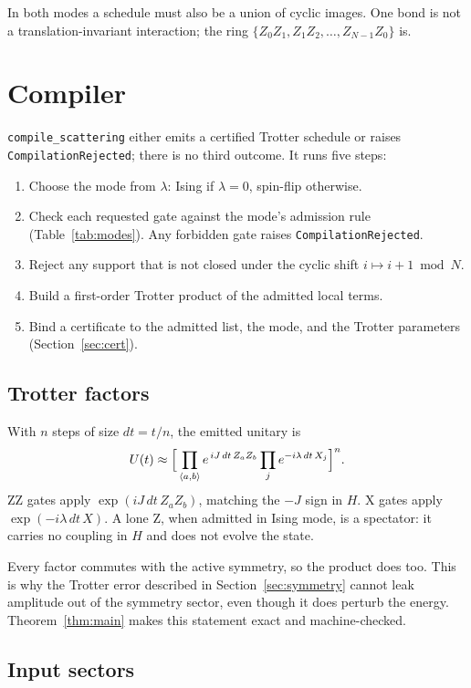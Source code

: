 \documentclass[11pt]{article}
\theoremstyle{definition}
\newcommand{\lean}[1]{\texttt{#1}}
\begin{document}
In both modes a schedule must also be a union of cyclic images. One bond is not a translation-invariant interaction; the ring $\{Z_0Z_1, Z_1Z_2, \dots, Z_{N-1}Z_0\}$ is.

\section{Compiler}

\lean{compile\_scattering} either emits a certified Trotter schedule or raises \lean{CompilationRejected}; there is no third outcome. It runs five steps:
\begin{enumerate}[nosep]
  \item Choose the mode from $\lambda$: Ising if $\lambda = 0$, spin-flip otherwise.
  \item Check each requested gate against the mode's admission rule (Table~\ref{tab:modes}). Any forbidden gate raises \lean{CompilationRejected}.
  \item Reject any support that is not closed under the cyclic shift $i \mapsto i + 1 \bmod N$.
  \item Build a first-order Trotter product of the admitted local terms.
  \item Bind a certificate to the admitted list, the mode, and the Trotter parameters (Section~\ref{sec:cert}).
\end{enumerate}

\subsection{Trotter factors}

With $n$ steps of size $dt = t/n$, the emitted unitary is
\begin{equation}
  U(t) \approx \Bigl[\, \prod_{\langle a,b\rangle} e^{\,iJ\,dt\,Z_aZ_b} \prod_j e^{-i\lambda\,dt\,X_j} \Bigr]^{n} .
\end{equation}
ZZ gates apply $\exp(iJ\,dt\,Z_aZ_b)$, matching the $-J$ sign in $H$. X gates apply $\exp(-i\lambda\,dt\,X)$. A lone Z, when admitted in Ising mode, is a spectator: it carries no coupling in $H$ and does not evolve the state.

Every factor commutes with the active symmetry, so the product does too. This is why the Trotter error described in Section~\ref{sec:symmetry} cannot leak amplitude out of the symmetry sector, even though it does perturb the energy. Theorem~\ref{thm:main} makes this statement exact and machine-checked.

\subsection{Input sectors}
\end{document}

